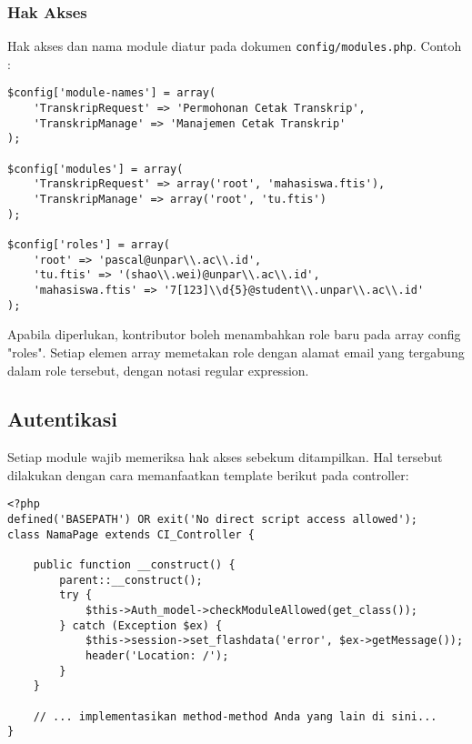 \subsubsection{Hak Akses}
Hak akses dan nama module diatur pada dokumen \texttt{config/modules.php}. Contoh :
\begin{lstlisting}
$config['module-names'] = array(
    'TranskripRequest' => 'Permohonan Cetak Transkrip',
    'TranskripManage' => 'Manajemen Cetak Transkrip'
);

$config['modules'] = array(
    'TranskripRequest' => array('root', 'mahasiswa.ftis'),
    'TranskripManage' => array('root', 'tu.ftis')
);

$config['roles'] = array(
    'root' => 'pascal@unpar\\.ac\\.id',
    'tu.ftis' => '(shao\\.wei)@unpar\\.ac\\.id',
    'mahasiswa.ftis' => '7[123]\\d{5}@student\\.unpar\\.ac\\.id'
);
\end{lstlisting}

Apabila diperlukan, kontributor boleh menambahkan role baru pada array config "roles". Setiap elemen array memetakan role dengan alamat email yang tergabung dalam role tersebut, dengan notasi regular expression.

\subsection{Autentikasi}
Setiap module wajib memeriksa hak akses sebekum ditampilkan. 
Hal tersebut dilakukan dengan cara memanfaatkan template berikut pada controller:
\begin{lstlisting}
<?php
defined('BASEPATH') OR exit('No direct script access allowed');
class NamaPage extends CI_Controller {

    public function __construct() {
        parent::__construct();
        try {
            $this->Auth_model->checkModuleAllowed(get_class());
        } catch (Exception $ex) {
            $this->session->set_flashdata('error', $ex->getMessage());
            header('Location: /');
        }
    }

    // ... implementasikan method-method Anda yang lain di sini...
}
\end{lstlisting}

